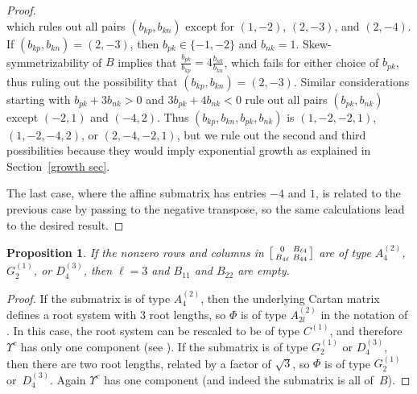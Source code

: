 \documentclass[10pt]{article}
\newtheorem{proposition}{Proposition}[section]
\theoremstyle{definition}
\theoremstyle{remark}
\numberwithin{equation}{section}
\newcommand{\set}[1]{{\lbrace #1 \rbrace}}
\newcommand{\0}{{\mathbf{0}}}
\newcommand{\RSChar}{\Phi}
\newcommand{\RS}{\RSChar}
\newcommand{\RSTChar}{\Upsilon}
\newcommand{\RST}[1]{\RSTChar^{#1}}
\begin{document}
\begin{proof}
\[\]
which rules out all pairs $(b_{kp},b_{kn})$ except for $(1,-2)$, $(2,-3)$, and $(2,-4)$.
If $(b_{kp},b_{kn})=(2,-3)$, then $b_{pk}\in\set{-1,-2}$ and $b_{nk}=1$.
Skew-symmetrizability of $B$ implies that $\frac{b_{pk}}{b_{kp}}=4\frac{b_{nk}}{b_{kn}}$, which fails for either choice of $b_{pk}$, thus ruling out the possibility that $(b_{kp},b_{kn})=(2,-3)$.
Similar considerations starting with $b_{pk}+3b_{nk}>0$ and $3b_{pk}+4b_{nk}<0$ rule out all pairs $(b_{pk},b_{nk})$ except $(-2,1)$ and $(-4,2)$.
Thus $(b_{kp},b_{kn},b_{pk},b_{nk})$ is $(1,-2,-2,1)$, $(1,-2,-4,2)$, or $(2,-4,-2,1)$, but we rule out the second and third possibilities because they would imply exponential growth as explained in Section~\ref{growth sec}.

The last case, where the affine submatrix has entries $-4$ and $1$, is related to the previous case by passing to the negative transpose, so the same calculations lead to the desired result.
\end{proof}

\begin{proposition}\label{one component}
If the nonzero rows and columns in $\begin{bsmallmatrix} 0 & B_{\ell4} \\ B_{4\ell} & B_{44} \end{bsmallmatrix}$ are of type $A_{4}^{(2)}$, $G_{2}^{(1)}$, or $D_{4}^{(3)}$, then $\ell=3$ and $B_{11}$ and $B_{22}$ are empty.
\end{proposition}
\begin{proof}
If the submatrix is of type $A_{4}^{(2)}$, then the underlying Cartan matrix defines a root system with 3 root lengths, so $\RS$ is of type $A_{2l}^{(2)}$ in the notation of \cite[Chapter~4]{Kac}.
In this case, the root system can be rescaled to be of type $C^{(1)}$, and therefore $\RST{c}$ has only one component (see \cite[Table 1]{affdenom}).
If the submatrix is of type $G_{2}^{(1)}$ or $D_{4}^{(3)}$, then there are two root lengths, related by a factor of $\sqrt{3}$, so $\RS$ is of type $G_{2}^{(1)}$ or~$D_{4}^{(3)}$.
Again $\RST{c}$ has one component (and indeed the submatrix is all of~$B$).
\end{proof}
\end{document}
